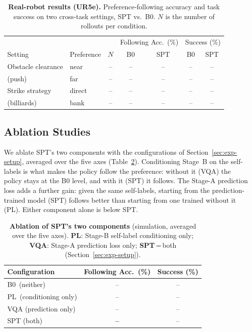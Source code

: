 \documentclass{article}
\begin{document}
\begin{table}[t]
  \centering
  \small
  \caption{\textbf{Real-robot results (UR5e).} Preference-following accuracy and
  task success on two cross-task settings, SPT vs.\ B0. $N$ is the number of
  rollouts per condition.}
  \label{tab:real_main}
  \begin{tabular}{llccccc}
    \hline
    & & & \multicolumn{2}{c}{Following Acc.\ (\%)} & \multicolumn{2}{c}{Success (\%)} \\
    Setting & Preference & $N$ & B0 & SPT & B0 & SPT \\
    \hline
    Obstacle clearance & near   & -- & -- & -- & -- & -- \\
    (push)             & far    & -- & -- & -- & -- & -- \\
    Strike strategy    & direct & -- & -- & -- & -- & -- \\
    (billiards)        & bank   & -- & -- & -- & -- & -- \\
    \hline
  \end{tabular}
\end{table}





\subsection{Ablation Studies}
\label{sec:exp-ablation}

We ablate SPT's two components with the configurations of
Section~\ref{sec:exp-setup}, averaged over the five axes
(Table~\ref{tab:ablation}). Conditioning Stage~B on the self-labels is what makes
the policy follow the preference: without it (VQA) the policy stays at the B0
level, and with it (SPT) it follows. The Stage-A prediction loss adds a further
gain: given the same self-labels, starting from the prediction-trained model
(SPT) follows better than starting from one trained without it (PL). Either
component alone is below SPT.

\begin{table}[t]
  \centering
  \small
  \caption{\textbf{Ablation of SPT's two components} (simulation, averaged over
  the five axes). \textbf{PL}: Stage-B self-label conditioning only;
  \textbf{VQA}: Stage-A prediction loss only; \textbf{SPT}\,=\,both
  (Section~\ref{sec:exp-setup}).}
  \label{tab:ablation}
  \begin{tabular}{lcc}
    \hline
    Configuration & Following Acc.\ (\%) & Success (\%) \\
    \hline
    B0 \,(neither)              & -- & -- \\
    PL \,(conditioning only)    & -- & -- \\
    VQA (prediction only)       & -- & -- \\
    SPT (both)                  & \textbf{--} & -- \\
    \hline
  \end{tabular}
\end{table}
\end{document}
